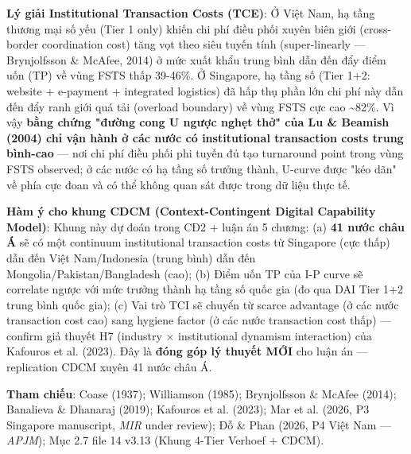 \documentclass[12pt,a4paper]{article}
\begin{document}
\textbf{Lý giải Institutional Transaction Costs (TCE)}: Ở Việt Nam, hạ
tầng thương mại số yếu (Tier 1 only) khiến chi phí điều phối xuyên biên
giới (cross-border coordination cost) tăng vọt theo siêu tuyến tính
(super-linearly --- Brynjolfsson \& McAfee, 2014) ở mức xuất khẩu trung
bình dẫn đến đẩy điểm uốn (TP) về vùng FSTS thấp 39-46\%. Ở Singapore,
hạ tầng số (Tier 1+2: website + e-payment + integrated logistics) đã hấp
thụ phần lớn chi phí này dẫn đến đẩy ranh giới quá tải (overload
boundary) về vùng FSTS cực cao \textasciitilde82\%. Vì vậy \textbf{bằng
chứng "đường cong U ngược nghẹt thở" của Lu \& Beamish (2004) chỉ vận
hành ở các nước có institutional transaction costs trung bình-cao} ---
nơi chi phí điều phối phi tuyến đủ tạo turnaround point trong vùng FSTS
observed; ở các nước có hạ tầng số trưởng thành, U-curve được "kéo dãn"
về phía cực đoan và có thể không quan sát được trong dữ liệu thực tế.

\textbf{Hàm ý cho khung CDCM (Context-Contingent Digital Capability
Model)}: Khung này dự đoán trong CĐ2 + luận án 5 chương: (a) \textbf{41
nước châu Á} sẽ có một continuum institutional transaction costs từ
Singapore (cực thấp) dẫn đến Việt Nam/Indonesia (trung bình) dẫn đến
Mongolia/Pakistan/Bangladesh (cao); (b) Điểm uốn TP của I-P curve sẽ
correlate ngược với mức trưởng thành hạ tầng số quốc gia (đo qua DAI
Tier 1+2 trung bình quốc gia); (c) Vai trò TCI sẽ chuyển từ scarce
advantage (ở các nước transaction cost cao) sang hygiene factor (ở các
nước transaction cost thấp) --- confirm giả thuyết H7 (industry ×
institutional dynamism interaction) của Kafouros et al. (2023). Đây là
\textbf{đóng góp lý thuyết MỚI} cho luận án --- replication CDCM xuyên
41 nước châu Á.

\textbf{Tham chiếu}: Coase (1937); Williamson (1985); Brynjolfsson \&
McAfee (2014); Banalieva \& Dhanaraj (2019); Kafouros et al. (2023); Mar
et al. (2026, P3 Singapore manuscript, \emph{MIR} under review); Đỗ \&
Phan (2026, P4 Việt Nam --- \emph{APJM}); Mục 2.7 file 14 v3.13 (Khung
4-Tier Verhoef + CDCM).
\end{document}
